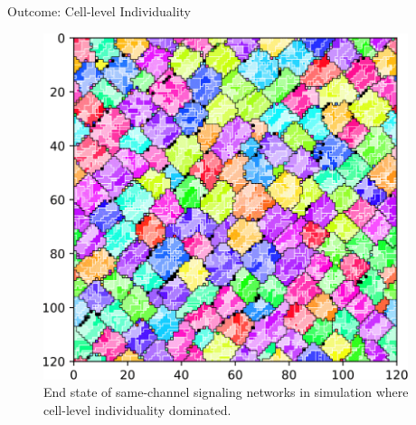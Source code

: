 \begin{frame}{Outcome: Cell-level Individuality}
\begin{figure}
\begin{columns}
\begin{column}{0.6\textwidth}
\includegraphics[width=\textwidth]{img/results/ChannelMap_1022_update19500000.png}
\end{column}
\begin{column}{0.4\textwidth}
\caption{
End state of same-channel signaling networks in simulation where cell-level individuality dominated.
}
\end{column}
\end{columns}
\end{figure}
\end{frame}

